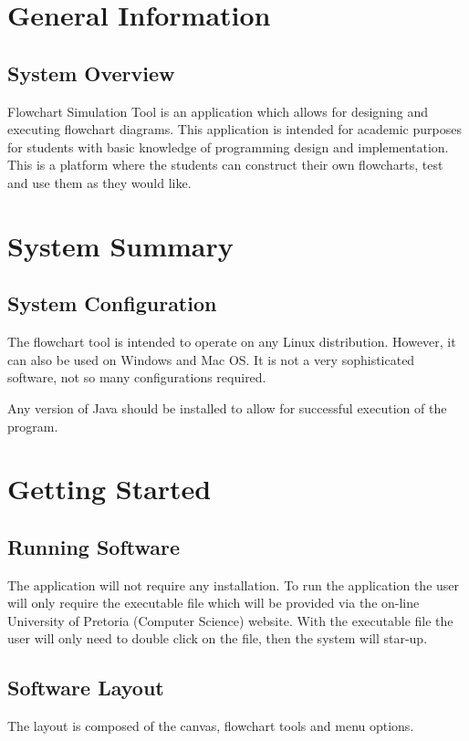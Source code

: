 \documentclass[11pt,a4paper,titlepage]{article}
\begin{document}

\newpage
\tableofcontents
{}
\newpage
{}
\section{General Information}
	\subsection{System Overview}
	
		Flowchart Simulation Tool is an application which allows for 				designing and executing flowchart diagrams. This application is 		intended for academic purposes for students with basic knowledge of 		programming design and implementation. This is a platform where the students can construct their own flowcharts, test and use them as they would like.
	
\section{System Summary}
	\subsection{System Configuration}
		
		The flowchart tool is intended to operate on any Linux 						distribution. However, it can also be used on Windows and 			Mac OS. It is not a very sophisticated software, not so many configurations required.
		
		Any version of Java should be installed to allow for successful execution of the program. 
	
\section{Getting Started}
	\subsection{Running Software}
		The application will not require any installation. To run the 			application the user will only require the executable file which will be provided via the on-line University of Pretoria (Computer Science) website. With the executable file the user will only need to double click on the file, then the system will star-up.
		
		\subsection{Software Layout}
		The layout is composed of the canvas, flowchart tools and menu options.
		
\end{document}
